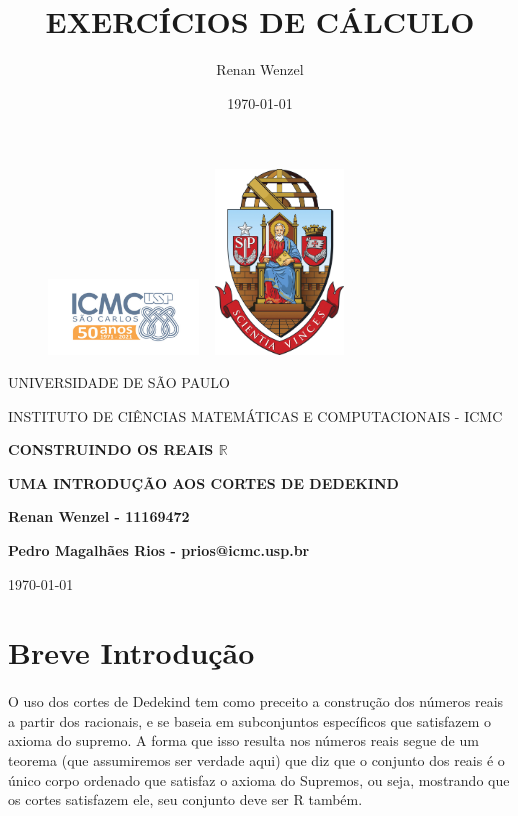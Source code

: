 \documentclass{article}
\title{EXERC\'ICIOS DE C\'ALCULO}
\author{Renan Wenzel}
\date{\today}
\begin{document}
\begin{figure}[ht]
		\includegraphics[width=4cm]{../icmc.png}
		\hspace{5cm}
		\includegraphics[height=4.9cm,width=4cm]{../brasao_usp_cor.jpg}
	\endminipage	
\end{figure}

\begin{center}
	\vspace{1cm}
	\LARGE
	UNIVERSIDADE DE S\~AO PAULO

	\vspace{1.3cm}
	\LARGE
	INSTITUTO DE CI\^ENCIAS MATEM\'ATICAS E COMPUTACIONAIS - ICMC

	\vspace{1.7cm}
	\Large
	\textbf{CONSTRUINDO OS REAIS $\mathbb{R}$}
	\vspace{0.5cm}

	\small
	\textbf{UMA INTRODU\c C\~AO AOS CORTES DE DEDEKIND}

	\vspace{1.3cm}
	\large
	\textbf{Renan Wenzel - 11169472}

	\vspace{1.3cm}
	\large
	\textbf{Pedro Magalh\~aes Rios - prios@icmc.usp.br}

	\vspace{1.3cm}
	\today
\end{center}

\newpage
\section{Breve Introdu\c c\~ao}

\paragraph{} O uso dos cortes de Dedekind tem como preceito a constru\c c\~ao dos n\'umeros reais a partir dos racionais, e se baseia em subconjuntos espec\'ificos que satisfazem o axioma do supremo. A forma que isso resulta nos n\'umeros reais segue de um teorema (que assumiremos ser verdade aqui) que diz que o conjunto dos reais \'e o \'unico corpo ordenado que satisfaz o axioma do Supremos, ou seja, mostrando que os cortes satisfazem ele, seu conjunto deve ser R tamb\'em. 
\end{document}
